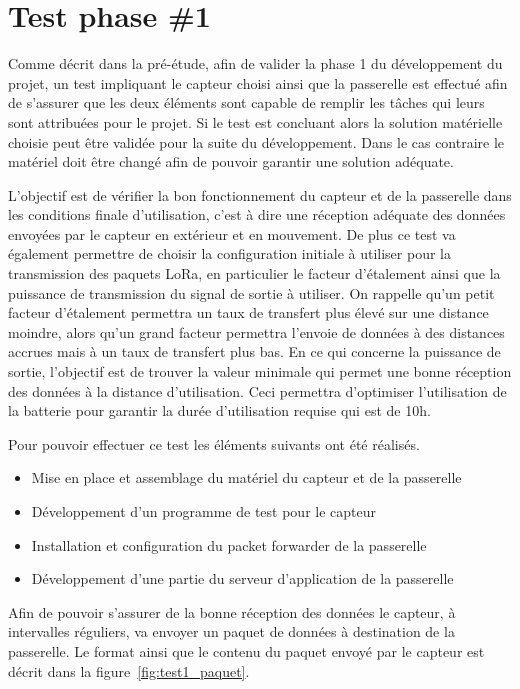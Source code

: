 \chapter{Test phase \#1}

Comme décrit dans la pré-étude, afin de valider la phase 1 du développement du projet, un test impliquant le capteur choisi ainsi que la passerelle est effectué afin de s'assurer que les deux éléments sont capable de remplir les tâches qui leurs sont attribuées pour le projet. Si le test est concluant alors la solution matérielle choisie peut être validée pour la suite du développement. Dans le cas contraire le matériel doit être changé afin de pouvoir garantir une solution adéquate.

L'objectif est de vérifier la bon fonctionnement du capteur et de la passerelle dans les conditions finale d'utilisation, c'est à dire une réception adéquate des données envoyées par le capteur en extérieur et en mouvement. De plus ce test va également permettre de choisir la configuration initiale à utiliser pour la transmission des paquets LoRa, en particulier le facteur d'étalement ainsi que la puissance de transmission du signal de sortie à utiliser. On rappelle qu'un petit facteur d'étalement permettra un taux de transfert plus élevé sur une distance moindre, alors qu'un grand facteur permettra l'envoie de données à des distances accrues mais à un taux de transfert plus bas. En ce qui concerne la puissance de sortie, l'objectif est de trouver la valeur minimale qui permet une bonne réception des données à la distance d'utilisation. Ceci permettra d'optimiser l'utilisation de la batterie pour garantir la durée d'utilisation requise qui est de 10h.

Pour pouvoir effectuer ce test les éléments suivants ont été réalisés.

\begin{itemize}
\item Mise en place et assemblage du matériel du capteur et de la passerelle
\item Développement d'un programme de test pour le capteur
\item Installation et configuration du packet forwarder de la passerelle
\item Développement d'une partie du serveur d'application de la passerelle
\end{itemize}

Afin de pouvoir s'assurer de la bonne réception des données le capteur, à intervalles réguliers, va envoyer un paquet de données à destination de la passerelle. Le format ainsi que le contenu du paquet envoyé par le capteur est décrit dans la figure~\ref{fig:test1_paquet}.

